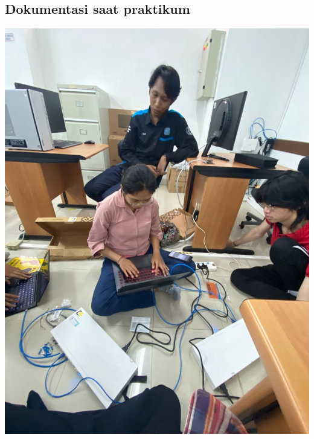 \subsection{Dokumentasi saat praktikum}
    \begin{center}
        \includegraphics[scale=0.1]{P1/img/1-8.jpg}
    \end{center}
